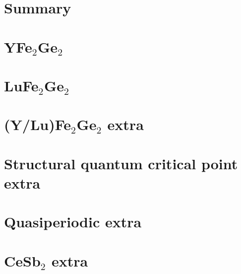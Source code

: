 %


\section{Summary}



\appendix





\section{YFe$_2$Ge$_2$}
%


\section{LuFe$_2$Ge$_2$}

\section{(Y/Lu)Fe$_2$Ge$_2$ extra}




\section{Structural quantum critical point extra}


\section{Quasiperiodic extra}


%
%




% 
\section{CeSb$_2$ extra}






% 


% 
% 

% 


% 


% 




